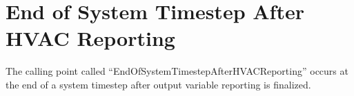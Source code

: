 \section{End of System Timestep After HVAC Reporting}\label{end-of-system-timestep-after-hvac-reporting}

The calling point called ``EndOfSystemTimestepAfterHVACReporting'' occurs at the end of a system timestep after output variable reporting is finalized.
